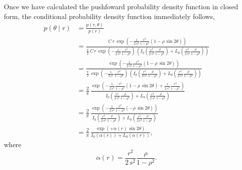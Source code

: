 \documentclass[
  letterpaper,
  DIV=11,
  numbers=noendperiod]{scrartcl}
\begin{document}
Once we have calculated the pushfoward probability density function in
closed form, the conditional probability density function immediately
follows, \begin{align*}
p(\theta \mid r)
&=
\frac{ p(r, \theta) }{ p(r) }
\\
&=
\frac{
C \, r \, \exp \left(
  - \frac{1}{2 \, s^{2}} \frac{r^{2}}{1 - \rho^{2}}
    ( 1 - \rho \, \sin 2 \theta)
\right)
}{
\frac{\pi}{2} \, C \, r \,
\exp \left(
  - \frac{1}{2 \, s^{2}} \frac{r^{2}}{1 - \rho^{2}}
\right) \,
\left(
  I_{0} \left(
    \frac{r^{2}}{2 \, s^{2}} \frac{\rho}{1 - \rho^{2}}
  \right)
+ L_{0} \left(
    \frac{r^{2}}{2 \, s^{2}} \frac{\rho}{1 - \rho^{2}}
  \right)
\right)
}
\\
&=
\frac{
\exp \left(
  - \frac{1}{2 \, s^{2}} \frac{r^{2}}{1 - \rho^{2}}
    ( 1 - \rho \, \sin 2 \theta)
\right)
}{
\frac{\pi}{2} \,
\exp \left(
  - \frac{1}{2 \, s^{2}} \frac{r^{2}}{1 - \rho^{2}}
\right) \,
\left(
  I_{0} \left(
    \frac{r^{2}}{2 \, s^{2}} \frac{\rho}{1 - \rho^{2}}
  \right)
+ L_{0} \left(
    \frac{r^{2}}{2 \, s^{2}} \frac{\rho}{1 - \rho^{2}}
  \right)
\right)
}
\\
&=
\frac{2}{\pi} \,
\frac{
\exp \left(
  - \frac{1}{2 \, s^{2}} \frac{r^{2}}{1 - \rho^{2}}
    ( 1 - \rho \, \sin 2 \theta)
  + \frac{1}{2 \, s^{2}} \frac{r^{2}}{1 - \rho^{2}}
\right)
}{
  I_{0} \left(
    \frac{r^{2}}{2 \, s^{2}} \frac{\rho}{1 - \rho^{2}}
  \right)
+ L_{0} \left(
    \frac{r^{2}}{2 \, s^{2}} \frac{\rho}{1 - \rho^{2}}
  \right)
}
\\
&=
\frac{2}{\pi} \,
\frac{
\exp \left(
  - \frac{1}{2 \, s^{2}} \frac{r^{2}}{1 - \rho^{2}}
    (- \rho \, \sin 2 \theta)
\right)
}{
  I_{0} \left(
    \frac{r^{2}}{2 \, s^{2}} \frac{\rho}{1 - \rho^{2}}
  \right)
+ L_{0} \left(
    \frac{r^{2}}{2 \, s^{2}} \frac{\rho}{1 - \rho^{2}}
  \right)
}
\\
&=
\frac{2}{\pi} \,
\frac{
\exp \left(+ \alpha(r) \, \sin 2 \theta \right)
}{
  I_{0} \left( \alpha(r) \right) + L_{0} \left( \alpha(r) \right)
},
\end{align*} where \[
\alpha(r) = \frac{r^{2}}{2 \, s^{2}} \frac{\rho}{1 - \rho^{2}}.
\]
\end{document}
